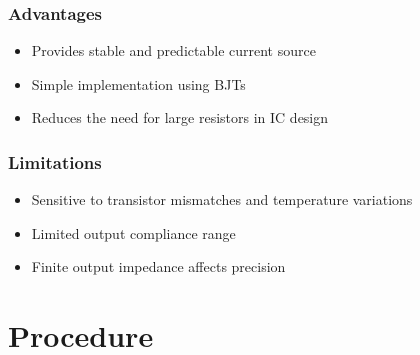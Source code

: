 \documentclass[conference]{IEEEtran}
\begin{document}
\subsubsection{Advantages}
\begin{itemize}
    \item Provides stable and predictable current source
    \item Simple implementation using BJTs
    \item Reduces the need for large resistors in IC design
\end{itemize}

\subsubsection{Limitations}
\begin{itemize}
    \item Sensitive to transistor mismatches and temperature variations
    \item Limited output compliance range
    \item Finite output impedance affects precision
\end{itemize}

\section{Procedure}
\end{document}
